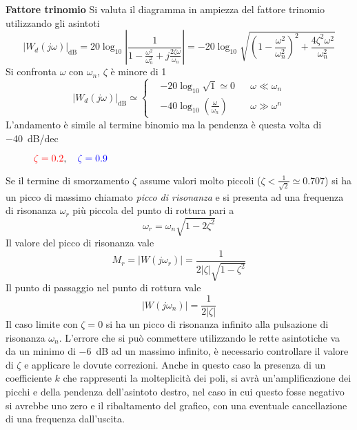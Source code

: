 \newpage
\textbf{Fattore trinomio}
Si valuta il diagramma in ampiezza del fattore trinomio utilizzando gli asintoti
$$
|W_d(j\omega)|_{\si{\deci\bel}} = 20\log_{10} \left|\frac{1}
{1-\frac{\omega^2}{\omega_n^2}+j\frac{2\zeta\omega}{\omega_n}}\right|=
-20\log_{10}\sqrt{
\left(1-\frac{\omega^2}{\omega_n^2}\right)^2+\frac{4\zeta^2\omega^2}
{\omega_n^2} }
$$
Si confronta $\omega$ con $\omega_n$, $\zeta$ è minore di 1
$$
|W_d(j\omega)|_{\si{\deci\bel}} \simeq\left\{
\begin{aligned}
&-20\log_{10}\sqrt{1}\simeq 0 & &\omega\ll\omega_n \\
&-40\log_{10}\left(\frac{\omega}{\omega_n}\right) & & \omega\gg\omega^n
\end{aligned}\right.
$$
L'andamento è simile al termine binomio ma la pendenza è questa volta di
\SI{-40}{\deci\bel/dec}
\begin{figure}[h]
\centering
\def\Wn{10}
\def\zOne{0.2}
\def\K{1}
\def\zTwo{0.9}
\caption{$\textcolor{red}{\zeta=\zOne},\quad \textcolor{blue}{\zeta=\zTwo} $}
\label{fig.amplitude_trinomio}
\end{figure}

Se il termine di smorzamento $\zeta$ assume valori molto piccoli
($\zeta<\frac{1}{\sqrt{2}}\simeq0.707$) si ha un picco di massimo chiamato
\textit{picco di risonanza} e si presenta ad una frequenza di risonanza
$\omega_r$ più piccola del punto di rottura pari a
$$
\omega_r = \omega_n\sqrt{1-2\zeta^2}
$$
Il valore del picco di risonanza vale
$$
M_r = |W(j\omega_r)| = \frac{1}{2|\zeta|\sqrt{1-\zeta^2}}
$$
Il punto di passaggio nel punto di rottura vale
$$
|W(j\omega_n)| = \frac{1}{2|\zeta|}
$$
Il caso limite con $\zeta=0$ si ha un picco di risonanza infinito alla
pulsazione di risonanza $\omega_n$.
L'errore che si può commettere utilizzando le rette asintotiche va da un minimo
di \SI{-6}{\deci\bel} ad un massimo infinito, è necessario controllare il
valore di $\zeta$ e applicare le dovute correzioni.
Anche in questo caso la presenza di un coefficiente $k$ che rappresenti la
molteplicità dei poli, si avrà un'amplificazione dei picchi e della pendenza
dell'asintoto destro, nel caso in cui questo fosse negativo si avrebbe uno zero
e il ribaltamento del grafico, con una eventuale cancellazione di una frequenza
dall'uscita.

